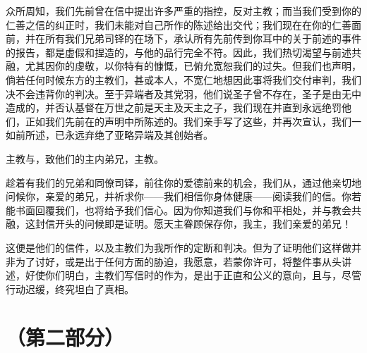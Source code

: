 众所周知，我们先前曾在信中提出许多严重的指控，反对主教；而当我们受到你的仁善之信的纠正时，我们未能对自己所作的陈述给出交代；我们现在在你的仁善面前，并在所有我们兄弟司铎的在场下，承认所有先前传到你耳中的关于前述的事件的报告，都是虚假和捏造的，与他的品行完全不符。因此，我们热切渴望与前述共融，尤其因你的虔敬，以你特有的慷慨，已俯允宽恕我们的过失。但我们也声明，倘若任何时候东方的主教们，甚或本人，不宽仁地想因此事将我们交付审判，我们决不会违背你的判决。至于异端者及其党羽，他们说圣子曾不存在，圣子是由无中造成的，并否认基督在万世之前是天主及天主之子，我们现在并直到永远绝罚他们，正如我们先前在的声明中所陈述的。我们亲手写了这些，并再次宣认，我们一如前所述，已永远弃绝了亚略异端及其创始者。\par

\par

主教与，致他们的主内弟兄，主教。\par

趁着有我们的兄弟和同僚司铎，前往你的爱德前来的机会，我们从，通过他亲切地问候你，亲爱的弟兄，并祈求你——我们相信你身体健康——阅读我们的信。你若能书面回覆我们，也将给予我们信心。因为你知道我们与你和平相处，并与教会共融，这封信开头的问候即是证明。愿天主眷顾保存你，我主，我们亲爱的弟兄！\par

这便是他们的信件，以及主教们为我所作的定断和判决。但为了证明他们这样做并非为了讨好，或是出于任何方面的胁迫，我愿意，若蒙你许可，将整件事从头讲述，好使你们明白，主教们写信时的作为，是出于正直和公义的意向，且与，尽管行动迟缓，终究坦白了真相。\par



\section{（第二部分）}

